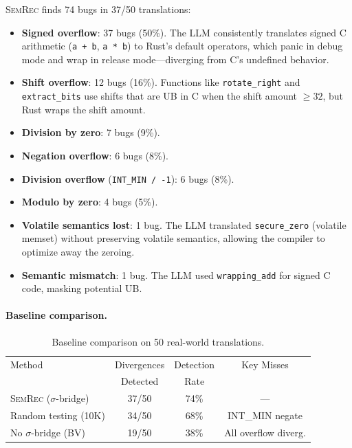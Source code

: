 \documentclass[11pt,a4paper]{article}
\begin{document}
\textsc{SemRec} finds 74 bugs in 37/50 translations:
\begin{itemize}
  \item \textbf{Signed overflow}: 37 bugs (50\%).  The LLM consistently
    translates signed C arithmetic (\texttt{a + b}, \texttt{a * b}) to
    Rust's default operators, which panic in debug mode and wrap in release
    mode---diverging from C's undefined behavior.
  \item \textbf{Shift overflow}: 12 bugs (16\%).  Functions like
    \texttt{rotate\_right} and \texttt{extract\_bits}
    use shifts that are UB in C when the
    shift amount $\geq 32$, but Rust wraps the shift amount.
  \item \textbf{Division by zero}: 7 bugs (9\%).
  \item \textbf{Negation overflow}: 6 bugs (8\%).
  \item \textbf{Division overflow} (\texttt{INT\_MIN / -1}): 6 bugs (8\%).
  \item \textbf{Modulo by zero}: 4 bugs (5\%).
  \item \textbf{Volatile semantics lost}: 1 bug.  The LLM translated
    \texttt{secure\_zero} (volatile memset) without preserving volatile
    semantics, allowing the compiler to optimize away the zeroing.
  \item \textbf{Semantic mismatch}: 1 bug.  The LLM used
    \texttt{wrapping\_add} for signed C code, masking potential UB.
\end{itemize}

\paragraph{Baseline comparison.}

\begin{table}[t]
\centering
\small
\caption{Baseline comparison on 50 real-world translations.}
\label{tab:baseline}
\begin{tabular}{@{}lccc@{}}
\toprule
Method & Divergences & Detection & Key Misses \\
 & Detected & Rate & \\
\midrule
\textsc{SemRec} ($\sigma$-bridge) & 37/50 & 74\% & --- \\
Random testing (10K) & 34/50 & 68\% & INT\_MIN negate \\
No $\sigma$-bridge (BV) & 19/50 & 38\% & All overflow diverg. \\
\bottomrule
\end{tabular}
\end{table}
\end{document}
